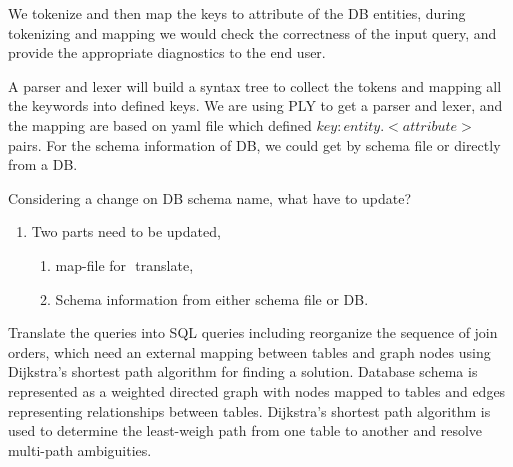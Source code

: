  We tokenize and then map the keys to attribute of the DB entities, during tokenizing and mapping we would check the correctness of the input query, and provide the appropriate diagnostics to the end user.

 A parser and lexer will build a syntax tree to collect the tokens and mapping all the keywords into defined keys. We are using PLY to get a parser and lexer, and the mapping are based on yaml file which defined \(key : entity.<attribute>\) pairs. For the schema information of DB, we could get by schema file or directly from a DB.

Considering a change on DB schema name, what have to update?
\begin{enumerate}
\item Two parts need to be updated,
    \begin{enumerate} 
    \item map-file for \(<key: entity>\) translate,
    \item Schema information from either schema file or DB.
    \end{enumerate}
\end{enumerate}

Translate the queries into SQL queries including reorganize the sequence of join orders, which need an external mapping between tables and graph nodes using Dijkstra's shortest path algorithm for finding a solution. Database schema is represented as a weighted directed graph with nodes mapped to tables and edges representing relationships between tables. Dijkstra's shortest path algorithm is used to determine the least-weigh path from one table to another and resolve multi-path ambiguities.

